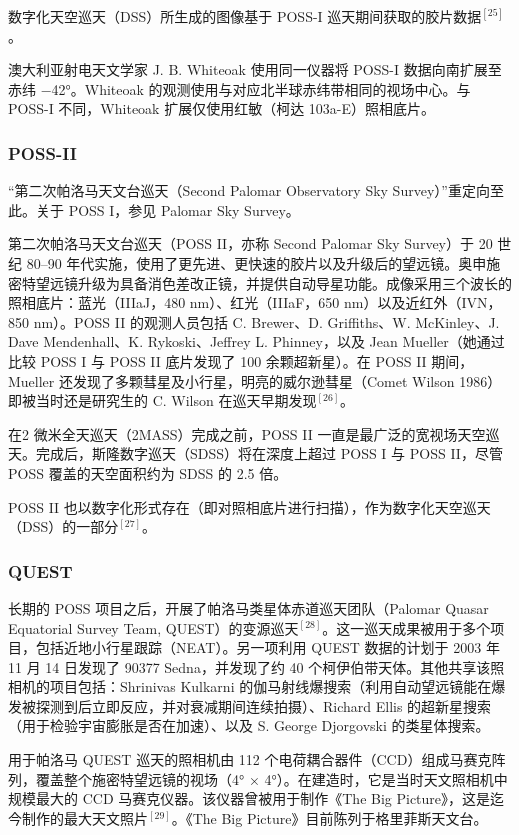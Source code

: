 数字化天空巡天（DSS）所生成的图像基于 POSS-I 巡天期间获取的胶片数据$^{[25]}$。

澳大利亚射电天文学家 J. B. Whiteoak 使用同一仪器将 POSS-I 数据向南扩展至赤纬 −42°。Whiteoak 的观测使用与对应北半球赤纬带相同的视场中心。与 POSS-I 不同，Whiteoak 扩展仅使用红敏（柯达 103a-E）照相底片。
\subsubsection{POSS-II}
“第二次帕洛马天文台巡天（Second Palomar Observatory Sky Survey）”重定向至此。关于 POSS I，参见 Palomar Sky Survey。

第二次帕洛马天文台巡天（POSS II，亦称 Second Palomar Sky Survey）于 20 世纪 80–90 年代实施，使用了更先进、更快速的胶片以及升级后的望远镜。奥申施密特望远镜升级为具备消色差改正镜，并提供自动导星功能。成像采用三个波长的照相底片：蓝光（IIIaJ，480 nm）、红光（IIIaF，650 nm）以及近红外（IVN，850 nm）。POSS II 的观测人员包括 C. Brewer、D. Griffiths、W. McKinley、J. Dave Mendenhall、K. Rykoski、Jeffrey L. Phinney，以及 Jean Mueller（她通过比较 POSS I 与 POSS II 底片发现了 100 余颗超新星）。在 POSS II 期间，Mueller 还发现了多颗彗星及小行星，明亮的威尔逊彗星（Comet Wilson 1986）即被当时还是研究生的 C. Wilson 在巡天早期发现$^{[26]}$。

在2 微米全天巡天（2MASS）完成之前，POSS II 一直是最广泛的宽视场天空巡天。完成后，斯隆数字巡天（SDSS）将在深度上超过 POSS I 与 POSS II，尽管 POSS 覆盖的天空面积约为 SDSS 的 2.5 倍。

POSS II 也以数字化形式存在（即对照相底片进行扫描），作为数字化天空巡天（DSS）的一部分$^{[27]}$。
\subsubsection{QUEST}
长期的 POSS 项目之后，开展了帕洛马类星体赤道巡天团队（Palomar Quasar Equatorial Survey Team, QUEST）的变源巡天$^{[28]}$。这一巡天成果被用于多个项目，包括近地小行星跟踪（NEAT）。另一项利用 QUEST 数据的计划于 2003 年 11 月 14 日发现了 90377 Sedna，并发现了约 40 个柯伊伯带天体。其他共享该照相机的项目包括：Shrinivas Kulkarni 的伽马射线爆搜索（利用自动望远镜能在爆发被探测到后立即反应，并对衰减期间连续拍摄）、Richard Ellis 的超新星搜索（用于检验宇宙膨胀是否在加速）、以及 S. George Djorgovski 的类星体搜索。

用于帕洛马 QUEST 巡天的照相机由 112 个电荷耦合器件（CCD）组成马赛克阵列，覆盖整个施密特望远镜的视场（4° × 4°）。在建造时，它是当时天文照相机中规模最大的 CCD 马赛克仪器。该仪器曾被用于制作《The Big Picture》，这是迄今制作的最大天文照片$^{[29]}$。《The Big Picture》目前陈列于格里菲斯天文台。
